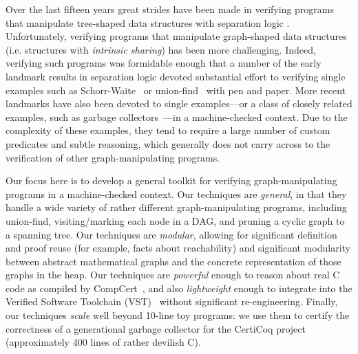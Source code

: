 Over the last fifteen years great strides have been made in verifying programs that manipulate
tree-shaped data structures with separation logic
\cite{berdine:smallfoot,chin:hipsleek,jacobs:verifast,chlipala:bedrock,bengtson:charge,appel:programlogics}.  Unfortunately, verifying programs that manipulate graph-shaped data structures (i.e. structures with \emph{intrinsic sharing}) has been more challenging.  Indeed, verifying such programs was formidable enough that a number of the early landmark results in separation logic devoted substantial effort to verifying single examples such as Schorr-Waite~\cite{hongseok:phd} or union-find~\cite{NeelThesis} with pen and paper.  More recent landmarks have also been devoted to single examples---or a class of closely related examples, such as garbage collectors~\cite{A,CakeMLGC,C}---in a machine-checked context.
Due to the complexity of these examples, they tend to require a large number of custom predicates and subtle reasoning, which generally does not carry across to the verification of other graph-manipulating programs.

Our focus here is to develop a general toolkit for verifying graph-manipulating programs in a machine-checked context.  Our techniques are \emph{general}, in that they handle a wide variety of rather different graph-manipulating programs, including union-find, visiting/marking each node in a DAG, and pruning a cyclic graph to a spanning tree. 
Our techniques are \emph{modular}, allowing for significant definition and proof reuse (for example, facts about reachability) and significant modularity between abstract mathematical graphs and the concrete representation of those graphs in the heap.
Our techniques are \emph{powerful} enough to reason about real C code as compiled by CompCert~\cite{blah}, and also \emph{lightweight} enough to integrate into the Verified Software Toolchain (VST)~\cite{appel:programlogics} without significant re-engineering.
Finally, our techniques \emph{scale} well beyond 10-line toy programs: we use them to certify the correctness of a generational garbage collector for the CertiCoq project~\cite{blah} (approximately 400 lines of rather devilish C).

